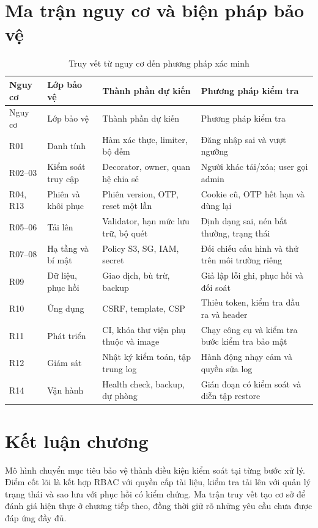\section{Ma trận nguy cơ và biện pháp bảo vệ}
{\small\begin{longtable}{P{1.1cm}P{3.3cm}P{4.4cm}P{4cm}}
\caption{Truy vết từ nguy cơ đến phương pháp xác minh}\\\toprule
\textbf{Nguy cơ}&\textbf{Lớp bảo vệ}&\textbf{Thành phần dự kiến}&\textbf{Phương pháp kiểm tra}\\\midrule\endfirsthead
\toprule Nguy cơ&Lớp bảo vệ&Thành phần dự kiến&Phương pháp kiểm tra\\\midrule\endhead
R01 & Danh tính & Hàm xác thực, limiter, bộ đếm & Đăng nhập sai và vượt ngưỡng\\
R02--03 & Kiểm soát truy cập & Decorator, owner, quan hệ chia sẻ & Người khác tải/xóa; user gọi admin\\
R04, R13 & Phiên và khôi phục & Phiên version, OTP, reset một lần & Cookie cũ, OTP hết hạn và dùng lại\\
R05--06 & Tải lên & Validator, hạn mức lưu trữ, bộ quét & Định dạng sai, nén bất thường, trạng thái\\
R07--08 & Hạ tầng và bí mật & Policy S3, SG, IAM, secret & Đối chiếu cấu hình và thử trên môi trường riêng\\
R09 & Dữ liệu, phục hồi & Giao dịch, bù trừ, backup & Giả lập lỗi ghi, phục hồi và đối soát\\
R10 & Ứng dụng & CSRF, template, CSP & Thiếu token, kiểm tra đầu ra và header\\
R11 & Phát triển & CI, khóa thư viện phụ thuộc và image & Chạy công cụ và kiểm tra bước kiểm tra bảo mật\\
R12 & Giám sát & Nhật ký kiểm toán, tập trung log & Hành động nhạy cảm và quyền sửa log\\
R14 & Vận hành & Health check, backup, dự phòng & Gián đoạn có kiểm soát và diễn tập restore\\\bottomrule
\end{longtable}}
\section{Kết luận chương}
Mô hình chuyển mục tiêu bảo vệ thành điều kiện kiểm soát tại từng bước xử lý. Điểm cốt lõi là kết hợp RBAC với quyền cấp tài liệu, kiểm tra tải lên với quản lý trạng thái và sao lưu với phục hồi có kiểm chứng. Ma trận truy vết tạo cơ sở để đánh giá hiện thực ở chương tiếp theo, đồng thời giữ rõ những yêu cầu chưa được đáp ứng đầy đủ.
